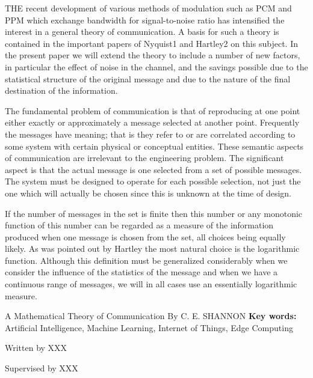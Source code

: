 
\begin{eabstract}
	THE recent development of various methods of modulation such as PCM and PPM which exchange bandwidth for signal-to-noise ratio has intensified the interest in a general theory of communication. A basis for such a theory is contained in the important papers of Nyquist1 and Hartley2 on this subject. In the present paper we will extend the theory to include a number of new factors, in particular the effect of noise in the channel, and the savings possible due to the statistical structure of the original message and due to the nature of the final destination of the information.

	The fundamental problem of communication is that of reproducing at one point either exactly or approximately a message selected at another point. Frequently the messages have meaning; that is they refer to or are correlated according to some system with certain physical or conceptual entities. These semantic aspects of communication are irrelevant to the engineering problem. The significant aspect is that the actual message is one selected from a set of possible messages. The system must be designed to operate for each possible selection, not just the one which will actually be chosen since this is unknown at the time of design.
	
	If the number of messages in the set is finite then this number or any monotonic function of this number can be regarded as a measure of the information produced when one message is chosen from the set, all choices being equally likely. As was pointed out by Hartley the most natural choice is the logarithmic function. Although this definition must be generalized considerably when we consider the influence of the statistics of the message and when we have a continuous range of messages, we will in all cases use an essentially logarithmic measure.

	A Mathematical Theory of Communication By C. E. SHANNON
	\vskip 21bp
	{\bf{} Key words: }
	Artificial Intelligence,
	Machine Learning,
	Internet of Things,
	Edge Computing
\end{eabstract}

\begin{flushright}
	Written by XXX
	
	Supervised by XXX
\end{flushright}
